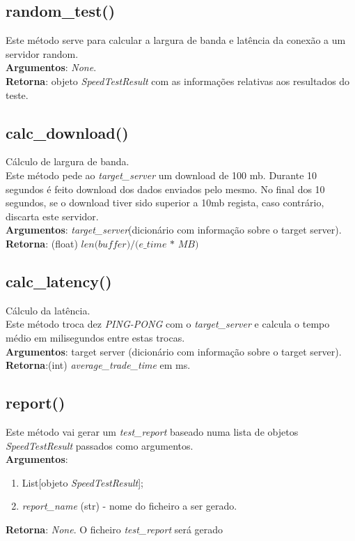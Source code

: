 \documentclass{report}
\begin{document}
\subsection{random\_test()}
\label{subsec.randt}
Este método serve para calcular a largura de banda e latência da conexão a um servidor random.\\ 
\textbf{Argumentos}: \textit{None}.\\
\textbf{Retorna}: objeto \textit{SpeedTestResult} com as informações relativas aos resultados do teste.


\subsection{calc\_download()}
\label{subsec.download}
Cálculo de largura de banda.\\
Este método pede ao \textit{target\_server} um download de 100 mb. Durante 10 segundos é feito download dos dados enviados pelo mesmo. No final dos 10 segundos, se o download tiver sido superior a 10mb regista, caso contrário, discarta este servidor.\\
\textbf{Argumentos}: \textit{target\_server}(dicionário com informação sobre o target server). 
\textbf{Retorna}: (float) $\textit{len(buffer)}/\textit{(e\_time * MB)}$

\subsection{calc\_latency()}
\label{subsec.latency}
Cálculo da latência.\\ 
Este método troca dez \textit{PING-PONG} com o \textit{target\_server} e calcula o tempo médio em milisegundos entre estas trocas.\\
\textbf{Argumentos}: target server (dicionário com informação sobre o target server). 
\textbf{Retorna}:(int) \textit{average\_trade\_time} em ms.

\subsection{report()}
\label{subsec.report}
Este método vai gerar um \textit{test\_report} baseado numa lista de objetos \textit{SpeedTestResult} passados como argumentos.\\ 
\textbf{Argumentos}:
\begin{enumerate}
\item List[objeto \textit{SpeedTestResult}];
\item \textit{report\_name} (str) - nome do ficheiro a ser gerado.
\end{enumerate}
\textbf{Retorna}: \textit{None}. O ficheiro \textit{test\_report} será gerado
\end{document}
